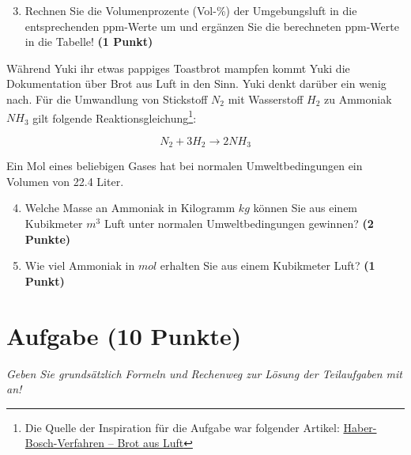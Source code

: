 \documentclass[a4paper, 9pt]{scrartcl}\usepackage[]{graphicx}\usepackage[]{xcolor}
\begin{document}
\begin{enumerate}
   \setcounter{enumi}{2}
\item Rechnen Sie die Volumenprozente (Vol-\%) der Umgebungsluft in die entsprechenden ppm-Werte um und ergänzen Sie die berechneten ppm-Werte in die Tabelle!  \textbf{(1 Punkt)}
\end{enumerate}

Während Yuki ihr etwas pappiges Toastbrot mampfen kommt Yuki die Dokumentation über Brot aus Luft in den Sinn. Yuki denkt darüber ein wenig nach. Für die Umwandlung von Stickstoff $N_2$ mit Wasserstoff $H_2$ zu Ammoniak $NH_3$ gilt folgende Reaktionsgleichung\footnote{Die Quelle der Inspiration für die Aufgabe war folgender Artikel: \href{https://www.gdch.de/netzwerk-strukturen/fachstrukturen/ag-chemie-und-gesellschaft/projekte-und-veranstaltungen/cartoons/haber-bosch-verfahren-brot-aus-luft.html}{Haber-Bosch-Verfahren – Brot aus Luft}}:

\begin{equation*}
  N_2 + 3H_2 \rightarrow 2NH_3
\end{equation*}  

Ein Mol eines beliebigen Gases hat bei normalen Umweltbedingungen ein Volumen von 22.4 Liter. %

\begin{enumerate}
  \setcounter{enumi}{3}
\item Welche Masse an Ammoniak in Kilogramm $kg$ können Sie aus einem Kubikmeter $m^3$ Luft unter normalen Umweltbedingungen gewinnen?
  \textbf{(2 Punkte)}
\item Wie viel Ammoniak in $mol$ erhalten Sie aus einem Kubikmeter Luft? \textbf{(1 Punkt)}
\end{enumerate}

 
\clearpage

\section{Aufgabe \hfill (10 Punkte)}

\textit{Geben Sie grundsätzlich Formeln und Rechenweg zur Lösung der Teilaufgaben mit an!} \\[1Ex]
 
\end{document}

